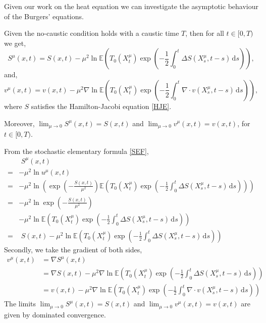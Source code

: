 \documentclass[a4paper,12pt,draft]{report}
\theoremstyle{remark}
\theoremstyle{definition}
\begin{document}
Given our work on the heat equation we can investigate the asymptotic behaviour of the Burgers' equations.
\cor
{
Given the no-caustic condition holds with a caustic time $T$, then for all $t \in [0, T)$ we get,
$$
S^\mu(x, t) = S(x, t) - \mu^2\ln\mathbb{E}\left(T_{0}(X^{\mu}_{t})\exp\left(-\frac{1}{2}\int_0^t \Delta S(X^{\mu}_{s}, t - s) \,\mathrm{d}s\right)\right),
$$
and,
$$
v^\mu(x, t) = v(x, t) - \mu^2\nabla\ln\mathbb{E}\left(T_{0}(X^{\mu}_{t})\exp\left(-\frac{1}{2}\int_0^t \nabla \cdot v(X^{\mu}_{s}, t - s)\,\mathrm{d}s\right)\right),
$$
where $S$ satisfies the Hamilton-Jacobi equation \eqref{HJE}.

Moreover, $\lim_{\mu \to 0}S^\mu(x, t) = S(x, t)$ and $\lim_{\mu \to 0}v^\mu(x, t) = v(x, t)$, for $t \in [0, T)$.
}
\proof
{
From the stochastic elementary formula \eqref{SEF},
\begin{align}
& \,\,S^\mu(x, t)\nonumber\\
= & -\mu^2\ln u^\mu(x, t)\nonumber\\
= & -\mu^2\ln\left(\exp\left(-\frac{S(x, t)}{\mu^2}\right)\mathbb{E}\left(T_{0}(X^{\mu}_{t})\exp\left(-\frac{1}{2}\int_0^t \Delta S(X^{\mu}_{s}, t - s)\,\mathrm{d}s\right)\right)\right)\nonumber\\
= & -\mu^2\ln\exp\left(-\frac{S(x, t)}{\mu^2}\right)\nonumber\\
& - \mu^2\ln\mathbb{E}\left(T_{0}(X^{\mu}_{t})\exp\left(-\frac{1}{2}\int_0^t \Delta S(X^{\mu}_{s}, t - s) \,\mathrm{d}s\right)\right)\nonumber\\
= & \,\,S(x, t) - \mu^2\ln\mathbb{E}\left(T_{0}(X^{\mu}_{t})\exp\left(-\frac{1}{2}\int_0^t \Delta S(X^{\mu}_{s}, t - s) \,\mathrm{d}s\right)\right)\nonumber
\end{align}
Secondly, we take the gradient of both sides,
\begin{align}
v^\mu(x, t) & = \nabla S^\mu(x, t)\nonumber\\
& = \nabla S(x, t) - \mu^2\nabla\ln\mathbb{E}\left(T_{0}(X^{\mu}_{t})\exp\left(-\frac{1}{2}\int_0^t \Delta S(X^{\mu}_{s}, t - s)\,\mathrm{d}s\right)\right)\nonumber\\
& = v(x, t) - \mu^2\nabla\ln\mathbb{E}\left(T_{0}(X^{\mu}_{t})\exp\left(-\frac{1}{2}\int_0^t \nabla \cdot v(X^{\mu}_{s}, t - s)\,\mathrm{d}s\right)\right)\nonumber
\end{align}
The limits $\lim_{\mu \to 0}S^\mu(x, t) = S(x, t)$ and $\lim_{\mu \to 0}v^\mu(x, t) = v(x, t)$ are given by dominated convergence.

\qedhere
}
\end{document}
